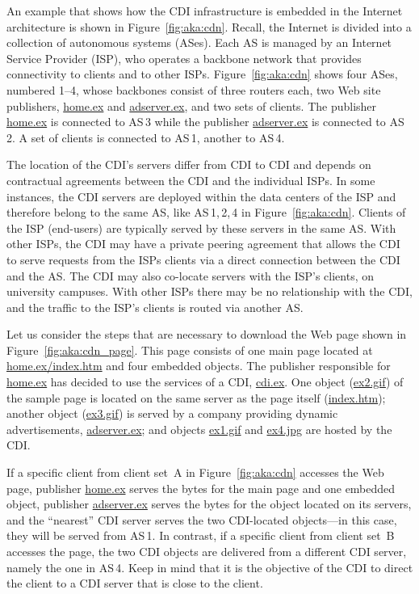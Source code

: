 An example that shows how the CDI infrastructure is embedded in the Internet
architecture is shown in Figure~\ref{fig:aka:cdn}. Recall, the Internet is
divided into a collection of autonomous systems (ASes).  Each AS is managed by
an Internet Service Provider (ISP), who operates a backbone network that
provides connectivity to clients and to other ISPs.  Figure~\ref{fig:aka:cdn}
shows four ASes, numbered 1--4, whose backbones consist of three routers each,
two Web site publishers, \url{home.ex} and \url{adserver.ex}, and two sets of
clients. The publisher \url{home.ex} is connected to AS\,3 while the publisher
\url{adserver.ex} is connected to AS\,2. A set of clients is connected to
AS\,1, another to AS\,4.

The location of the CDI's servers differ from CDI to CDI and depends on
contractual agreements between the CDI and the individual ISPs.  In some
instances, the CDI servers are deployed within the data centers of the ISP and
therefore belong to the same AS, like AS\,1,\,2,\,4 in
Figure~\ref{fig:aka:cdn}.  Clients of the ISP (end-users) are typically served
by these servers in the same AS.  With other ISPs, the CDI may have a private
peering agreement that allows the CDI to serve requests from the ISPs clients
via a direct connection between the CDI and the AS.  The CDI may also co-locate
servers with the ISP's clients, \eg on university campuses.  With other ISPs
there may be no relationship with the CDI, and the traffic to the ISP's clients
is routed via another AS.

Let us consider the steps that are necessary to download the Web page shown in
Figure~\ref{fig:aka:cdn_page}. This page consists of one main page located at
\url{home.ex/index.htm} and four embedded objects. The publisher responsible
for \url{home.ex} has decided to use the services of a CDI, \url{cdi.ex}. One
object (\url{ex2.gif}) of the sample page is located on the same server as the
page itself (\url{index.htm}); another object (\url{ex3.gif}) is served by a
company providing dynamic advertisements, \url{adserver.ex}; and objects
\url{ex1.gif} and \url{ex4.jpg} are hosted by the CDI.

If a specific client from client set~A in Figure~\ref{fig:aka:cdn} accesses the
Web page, publisher \url{home.ex}  serves the bytes for the main page and one
embedded object, publisher \url{adserver.ex} serves the bytes for the object
located on its servers, and the ``nearest'' CDI server serves the two
CDI-located objects---in this case, they will be served from AS\,1.  In
contrast, if a specific client from client set~B accesses the page, the two CDI
objects are delivered from a different CDI server, namely the one in AS\,4.
Keep in mind that it is the objective of the CDI to direct the client to a CDI
server that is close to the client.

